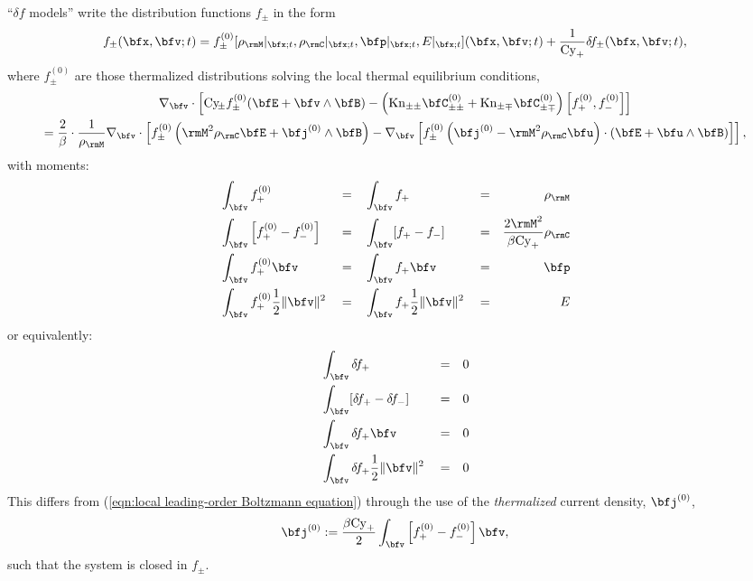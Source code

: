     \begin{definition}\label{def:delta f models}
        ``$\delta\!f$ models'' write the distribution functions $f_{\pm}$ in the form
        \begin{equation}
            f_{\pm}(\bfx, \bfv; t)  =  f_{\pm}^{(0)}[\rho_{\rmM}|_{\bfx; t}, \rho_{\rmC}|_{\bfx; t}, \bfp|_{\bfx; t}, E|_{\bfx; t}](\bfx, \bfv; t) + \frac{1}{\rmCy_{+}}\delta\!f_{\pm}(\bfx, \bfv; t),
        \end{equation}
        where $f_{\pm}^{(0)}$ are those thermalized distributions solving the local thermal equilibrium conditions,
        \begin{multline}\label{eqn:thermal equilibrium identity}
            \nabla_{\bfv}\cdot\left[\rmCy\!_{\pm}f_{\pm}^{(0)}(\bfE + \bfv\wedge\bfB) - \left(\rmKn_{\pm\pm}\bfC_{\pm\pm}^{(0)} + \rmKn_{\pm\mp}\bfC_{\pm\mp}^{(0)}\right)\left[f_{+}^{(0)}, f_{-}^{(0)}\right]\right]  \\
            =  \frac{2}{\beta}\cdot\frac{1}{\rho_{\rmM}}\nabla_{\bfv}\cdot\left[f_{\pm}^{(0)}\left(\rmM^{2}\rho_{\rmC}\bfE + \bfj^{(0)}\wedge\bfB\right) - \nabla_{\bfv}\left[f_{\pm}^{(0)}\left(\bfj^{(0)} - \rmM^{2}\rho_{\rmC}\bfu\right)\cdot\left(\bfE + \bfu\wedge\bfB\right)\right]\right],
        \end{multline}
        with moments:
        \begin{align}
            &\int_{\bfv}f_{+}^{(0)}                             &  &=  &  &\int_{\bfv}f_{+}                         &  &=  &  \rho_{\rmM}  \\
            &\int_{\bfv}\left[f_{+}^{(0)} - f_{-}^{(0)}\right]  &  &=  &  &\int_{\bfv}[f_{+} - f_{-}]               &  &=  &  \frac{2\rmM^{2}}{\beta\rmCy_{+}}\rho_{\rmC}  \\
            &\int_{\bfv}f_{+}^{(0)}\bfv                         &  &=  &  &\int_{\bfv}f_{+}\bfv                     &  &=  &  \bfp  \\
            &\int_{\bfv}f_{+}^{(0)}\frac{1}{2}\|\bfv\|^{2}      &  &=  &  &\int_{\bfv}f_{+}\frac{1}{2}\|\bfv\|^{2}  &  &=  &  E
        \end{align}
        or equivalently:
        \begin{align}
            &\int_{\bfv}\delta\!f_{+}                         &  &=  &  0  \label{eqn:correction mass moment}  \\
            &\int_{\bfv}[\delta\!f_{+} - \delta\!f_{-}]       &  &=  &  0  \\
            &\int_{\bfv}\delta\!f_{+}\bfv                     &  &=  &  0  \\
            &\int_{\bfv}\delta\!f_{+}\frac{1}{2}\|\bfv\|^{2}  &  &=  &  0  \label{eqn:correction energy moment}
        \end{align}
        This differs from (\ref{eqn:local leading-order Boltzmann equation}) through the use of the \emph{thermalized} current density, $\bfj^{(0)}$,
        \begin{equation}\label{eqn:thermalized current density}
            \bfj^{(0)}  :=  \frac{\beta\rmCy_{+}}{2}\int_{\bfv}\left[f_{+}^{(0)} - f_{-}^{(0)}\right]\bfv,
        \end{equation}
        such that the system is closed in $f_{\pm}$.


\end{definition}
